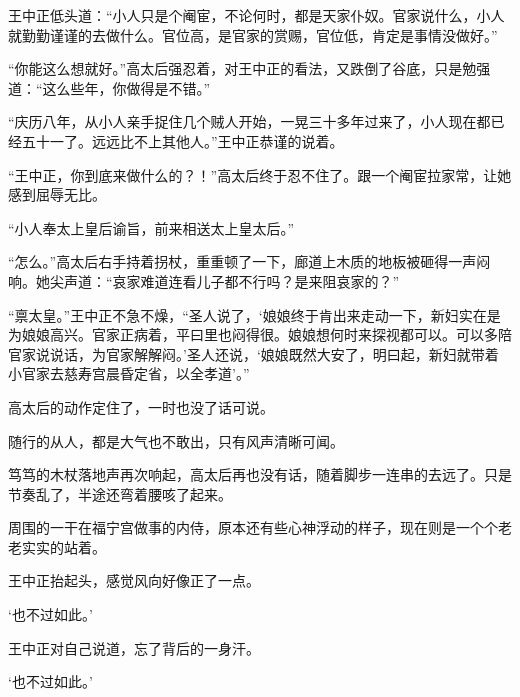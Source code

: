 王中正低头道：“小人只是个阉宦，不论何时，都是天家仆奴。官家说什么，小人就勤勤谨谨的去做什么。官位高，是官家的赏赐，官位低，肯定是事情没做好。”

“你能这么想就好。”高太后强忍着，对王中正的看法，又跌倒了谷底，只是勉强道：“这么些年，你做得是不错。”

“庆历八年，从小人亲手捉住几个贼人开始，一晃三十多年过来了，小人现在都已经五十一了。远远比不上其他人。”王中正恭谨的说着。

“王中正，你到底来做什么的？！”高太后终于忍不住了。跟一个阉宦拉家常，让她感到屈辱无比。

“小人奉太上皇后谕旨，前来相送太上皇太后。”

“怎么。”高太后右手持着拐杖，重重顿了一下，廊道上木质的地板被砸得一声闷响。她尖声道：“哀家难道连看儿子都不行吗？是来阻哀家的？”

“禀太皇。”王中正不急不燥，“圣人说了，‘娘娘终于肯出来走动一下，新妇实在是为娘娘高兴。官家正病着，平曰里也闷得很。娘娘想何时来探视都可以。可以多陪官家说说话，为官家解解闷。’圣人还说，‘娘娘既然大安了，明曰起，新妇就带着小官家去慈寿宫晨昏定省，以全孝道’。”

高太后的动作定住了，一时也没了话可说。

随行的从人，都是大气也不敢出，只有风声清晰可闻。

笃笃的木杖落地声再次响起，高太后再也没有话，随着脚步一连串的去远了。只是节奏乱了，半途还弯着腰咳了起来。

周围的一干在福宁宫做事的内侍，原本还有些心神浮动的样子，现在则是一个个老老实实的站着。

王中正抬起头，感觉风向好像正了一点。

‘也不过如此。’

王中正对自己说道，忘了背后的一身汗。

‘也不过如此。’

